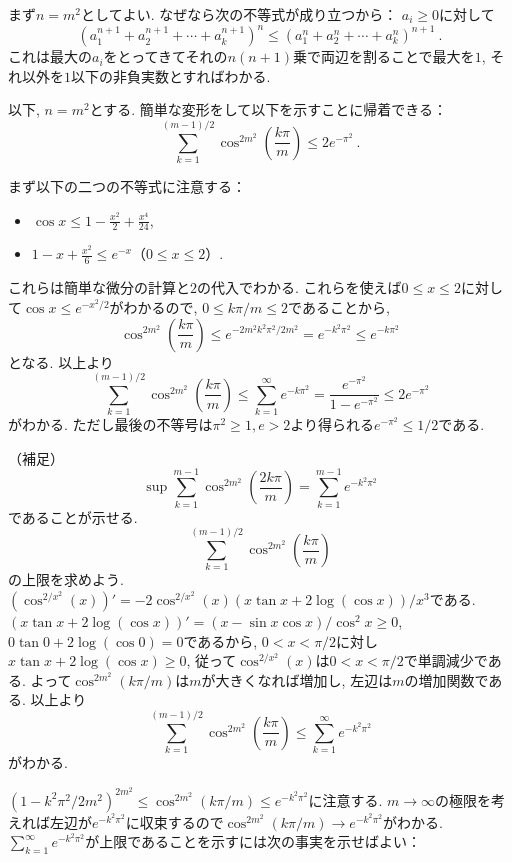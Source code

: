 \documentclass[uplatex, a5paper]{jsarticle}
\makeatletter
\theoremstyle{definition}
\renewenvironment{proof}[1][\proofname]{
  \pushQED{\qed}%
  \normalfont \topsep6\p@\@plus6\p@\relax
  \trivlist
  \item[\hskip\labelsep
    #1\@addpunct{\textbf{.}}]\ignorespaces
}{%
  \popQED\endtrivlist\@endpefalse
}
\providecommand{\proofname}{証明}
\def\qed{\hfill $\Box$}
\makeatother
\begin{document}
\begin{proof}

まず${n=m^2}$としてよい.
なぜなら次の不等式が成り立つから：
$a_i \geq 0$に対して
$$
(a_1^{n+1}+a_2^{n+1}+\cdots +a_k ^{n+1})^n \leq (a_1^n+a_2^n+\cdots+a_k ^n)^{n+1} \ .
$$
これは最大の$a_i$をとってきてそれの$n(n+1)$乗で両辺を割ることで最大を$1$, それ以外を$1$以下の非負実数とすればわかる.

以下, $n=m^2$とする.
簡単な変形をして以下を示すことに帰着できる：
$$
\sum _{k=1}^{(m-1)/2} \cos ^{2m^2}\left( \frac{k\pi }{m}\right) \leq 2e^{-\pi ^2} \ .
$$

まず以下の二つの不等式に注意する：
\begin{itemize}
 \item $\cos x \leq 1-\frac{x^2}{2}+\frac{x^4}{24}$,
 \item $1-x+\frac{x^2}{6} \leq e^{-x} $（$0\leq x \leq 2$）.
\end{itemize}
これらは簡単な微分の計算と$2$の代入でわかる.
これらを使えば$0\leq x \leq 2$に対して$\cos x \leq e^{-x^2/2}$がわかるので, $0 \leq k\pi /m \leq 2$であることから,
$$
\cos ^{2m^2}\left( \frac{k\pi }{m}\right) \leq e^{-2m^2k^2\pi ^2/ 2m^2 } = e^{-k^2 \pi ^2} \leq e^{-k\pi ^2}
$$
となる.
以上より
$$
\sum _{k=1}^{(m-1)/2} \cos ^{2m^2}\left( \frac{k\pi }{m}\right) \leq \sum _{k=1}^{\infty} e^{-k\pi ^2} = \frac{e^{-\pi ^2}}{1-e^{-\pi ^2}} \leq 2e^{-\pi ^2}
$$
がわかる.
ただし最後の不等号は$\pi ^2 \geq 1 , e > 2$より得られる$e^{-\pi ^2} \leq 1/2$である.

（補足）
$$
\sup \sum _{k=1}^{m-1} \cos ^{2m^2}\left( \frac{2k\pi}{m} \right) = \sum _{k=1}^{m-1} e^{-k^2\pi ^2}
$$
であることが示せる.
$$
\sum _{k=1}^{(m-1)/2} \cos ^{2m^2}\left( \frac{k\pi}{m} \right)
$$
の上限を求めよう.
$\left( \cos ^{2/x^2}(x) \right) ' = - 2\cos ^{2/x^2}(x) (x\tan x + 2\log (\cos x))/x^3$である.
$(x\tan x + 2\log (\cos x))'=(x-\sin x \cos x)/\cos ^2x \geq 0$, $0\tan 0 + 2\log (\cos 0)=0$であるから, $0<x<\pi /2$に対し$x\tan x + 2\log (\cos x) \geq 0$, 従って$\cos ^{2/x^2}(x)$は$0<x<\pi /2$で単調減少である.
よって$\cos ^{2m^2}(k\pi /m)$は$m$が大きくなれば増加し, 左辺は$m$の増加関数である.
以上より
$$
\sum _{k=1}^{(m-1)/2} \cos ^{2m^2}\left( \frac{k\pi}{m} \right) \leq \sum _{k=1}^{\infty} e^{-k^2\pi ^2}
$$
がわかる.

$(1-k^2\pi^2/2m^2)^{2m^2} \leq \cos ^{2m^2}(k\pi /m) \leq e^{-k^2\pi ^2}$に注意する.
$m\to \infty$の極限を考えれば左辺が$e^{-k^2\pi ^2}$に収束するので$\cos ^{2m^2}(k\pi /m) \to e^{-k^2\pi ^2}$がわかる.
$\sum _{k=1}^{\infty} e^{-k^2\pi ^2}$が上限であることを示すには次の事実を示せばよい：


\end{proof}
\end{document}
